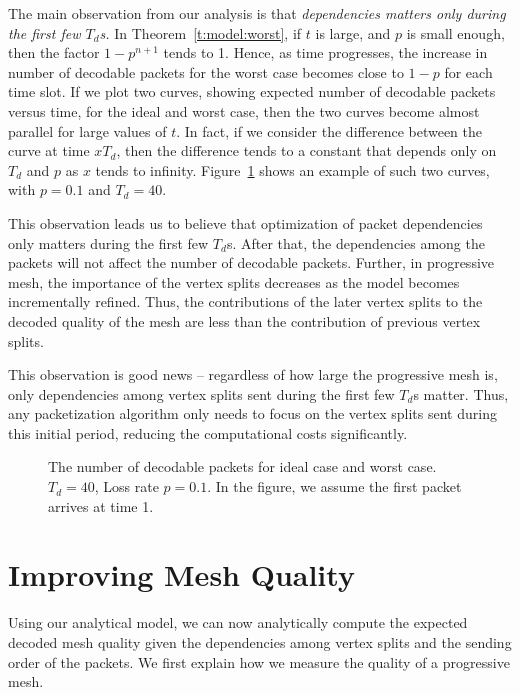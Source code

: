     
    The main observation from our analysis is that \textit{
    dependencies matters only during the first few $T_d$s.}
    In Theorem~\ref{t:model:worst}, if $t$ is large, and $p$ is small
    enough, then the factor $1-p^{n+1}$ tends to 1.  Hence, as
    time progresses, the increase in number of decodable packets
    for the worst case becomes close to $1-p$ for each time slot.
    If we plot two curves, showing expected number of decodable
    packets versus time, for the ideal and worst case, then the
    two curves become almost parallel for large values of $t$.  In fact,
    if we consider the difference between the curve at time $xT_d$,
    then the difference tends to a constant that depends only on
    $T_d$ and $p$ as $x$ tends to infinity.
    Figure~\ref{model:extreme} shows an example of such two curves, with
    $p = 0.1$ and $T_d = 40$.

    This observation leads us to believe that optimization of
    packet dependencies only matters during the first few $T_d$s. 
    After that, the dependencies among the packets will not affect
    the number of decodable packets.  Further, in progressive mesh,
    the importance of the vertex splits decreases as the model becomes
    incrementally refined.  Thus, the contributions of the later vertex
    splits to the decoded quality of the mesh are less than the contribution
    of previous vertex splits.

    This observation is good news -- regardless of how large the
    progressive mesh is, only dependencies among vertex splits sent during the
    first few $T_d$s matter.  Thus, any packetization
    algorithm only needs to focus on the vertex splits sent during
    this initial period, reducing the computational costs significantly.

\begin{figure}[htbp]
\centering
{}
\caption{The number of decodable packets for ideal case and worst case. $T_d= 40$, Loss rate $p =0.1$. In the figure, we assume the first packet arrives at time 1.}\label{model:extreme}
\end{figure}


\section{Improving Mesh Quality}
\label{s:model:quality}
    Using our analytical model, we can now analytically compute the
    expected decoded mesh quality given the dependencies among %
    vertex splits and %
    the sending order of the packets.
    We first explain how we measure the
    quality of a progressive mesh.
